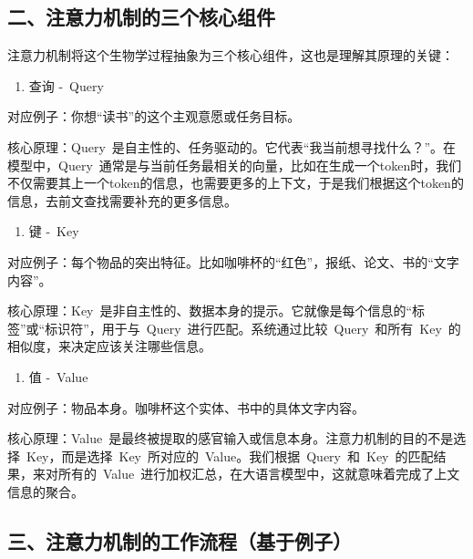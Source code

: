 \hypertarget{ux4e8cux6ce8ux610fux529bux673aux5236ux7684ux4e09ux4e2aux6838ux5fc3ux7ec4ux4ef6}{%
\subsection{二、注意力机制的三个核心组件}\label{ux4e8cux6ce8ux610fux529bux673aux5236ux7684ux4e09ux4e2aux6838ux5fc3ux7ec4ux4ef6}}

注意力机制将这个生物学过程抽象为三个核心组件，这也是理解其原理的关键：

\begin{enumerate}
\def\labelenumi{\arabic{enumi}.}
\tightlist
\item
  查询 -~Query
\end{enumerate}

对应例子：你想``读书''的这个主观意愿或任务目标。

核心原理：Query~是自主性的、任务驱动的。它代表``我当前想寻找什么？''。在模型中，Query~通常是与当前任务最相关的向量，比如在生成一个token时，我们不仅需要其上一个token的信息，也需要更多的上下文，于是我们根据这个token的信息，去前文查找需要补充的更多信息。

\begin{enumerate}
\def\labelenumi{\arabic{enumi}.}
\setcounter{enumi}{1}
\tightlist
\item
  键 -~Key
\end{enumerate}

对应例子：每个物品的突出特征。比如咖啡杯的``红色''，报纸、论文、书的``文字内容''。

核心原理：Key~是非自主性的、数据本身的提示。它就像是每个信息的``标签''或``标识符''，用于与~Query~进行匹配。系统通过比较~Query~和所有~Key~的相似度，来决定应该关注哪些信息。

\begin{enumerate}
\def\labelenumi{\arabic{enumi}.}
\setcounter{enumi}{2}
\tightlist
\item
  值 -~Value
\end{enumerate}

对应例子：物品本身。咖啡杯这个实体、书中的具体文字内容。

核心原理：Value~是最终被提取的感官输入或信息本身。注意力机制的目的不是选择~Key，而是选择~Key~所对应的~Value。我们根据~Query~和~Key~的匹配结果，来对所有的~Value~进行加权汇总，在大语言模型中，这就意味着完成了上文信息的聚合。

\hypertarget{ux4e09ux6ce8ux610fux529bux673aux5236ux7684ux5de5ux4f5cux6d41ux7a0bux57faux4e8eux4f8bux5b50}{%
\subsection{三、注意力机制的工作流程（基于例子）}\label{ux4e09ux6ce8ux610fux529bux673aux5236ux7684ux5de5ux4f5cux6d41ux7a0bux57faux4e8eux4f8bux5b50}}

